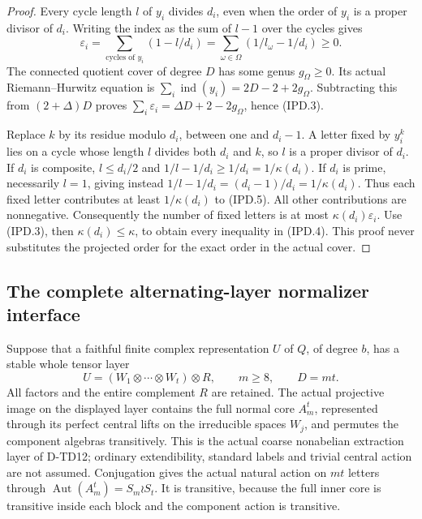 \begin{proof}
Every cycle length \(l\) of \(y_i\) divides \(d_i\), even
when the order of \(y_i\) is a proper divisor of \(d_i\).
Writing the index as the sum of \(l-1\) over the cycles gives
\[
 \varepsilon_i=\sum_{\text{cycles of }y_i}(1-l/d_i)
 =\sum_{\omega\in\Omega}(1/l_\omega-1/d_i)\ge0.
 \tag{IPD.5}
\]
The connected quotient cover of degree \(D\) has some genus
\(g_\Omega\ge0\). Its actual Riemann--Hurwitz equation is
\(\sum_i\operatorname{ind}(y_i)=2D-2+2g_\Omega\).
Subtracting this from \((2+\Delta)D\) proves
\(\sum_i\varepsilon_i=\Delta D+2-2g_\Omega\), hence (IPD.3).

Replace \(k\) by its residue modulo \(d_i\), between one
and \(d_i-1\). A letter fixed by \(y_i^k\) lies on a cycle
whose length \(l\) divides both \(d_i\) and \(k\), so
\(l\) is a proper divisor of \(d_i\). If \(d_i\) is
composite, \(l\le d_i/2\) and
\(1/l-1/d_i\ge1/d_i=1/\kappa(d_i)\).
If \(d_i\) is prime, necessarily \(l=1\), giving instead
\(1/l-1/d_i=(d_i-1)/d_i=1/\kappa(d_i)\).
Thus each fixed letter contributes at least \(1/\kappa(d_i)\)
to (IPD.5). All other contributions are nonnegative. Consequently
the number of fixed letters is at most
\(\kappa(d_i)\varepsilon_i\). Use (IPD.3), then
\(\kappa(d_i)\le\kappa\), to obtain every inequality in
(IPD.4). This proof never substitutes the projected order for
the exact order in the actual cover.
\end{proof}

\subsection*{The complete alternating-layer normalizer interface}

Suppose that a faithful finite complex representation \(U\) of
\(Q\), of degree \(b\), has a stable whole tensor layer
\[
 U=(W_1\otimes\cdots\otimes W_t)\otimes R,
 \qquad m\ge8,\qquad D=mt.
 \tag{IPD.6}
\]
All factors and the entire complement \(R\) are retained.
The actual projective image on the displayed layer contains the
full normal core \(A_m^t\), represented through its perfect
central lifts on the irreducible spaces \(W_j\), and permutes
the component algebras transitively. This is the actual coarse
nonabelian extraction layer of D-TD12; ordinary extendibility,
standard labels and trivial central action are not assumed.
Conjugation gives the actual natural action on \(mt\) letters
through \(\operatorname{Aut}(A_m^t)=S_m\wr S_t\).
It is transitive, because the full inner core is transitive
inside each block and the component action is transitive.

